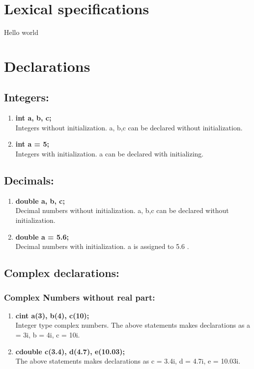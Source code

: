 \documentclass[12pt]{article}
\begin{document}
\section{Lexical specifications}
Hello world 
\section{Declarations}
\subsection{Integers:}

\begin{enumerate}
    \item \textbf{int a, b, c;} \\
        Integers without initialization. a, b,c can be declared without initialization.
    \item  \textbf{int a = 5;}\\
        Integers with initialization. a can be declared with initializing.
\end{enumerate}

\subsection{Decimals:}
\begin{enumerate}
    \item \textbf{double a, b, c;} \\
        Decimal numbers without initialization. a, b,c can be declared without initialization.
    \item  \textbf{double a = 5.6;}\\
        Decimal numbers with initialization. a is assigned to 5.6 .
\end{enumerate}
\subsection{Complex declarations:}
\subsubsection{Complex Numbers without real part:}
\begin{enumerate}
    \item \textbf{cint a(3), b(4), c(10);}\\
Integer type complex numbers.
The above statements makes declarations as a = 3i, b = 4i, c = 10i.
    \item \textbf{cdouble c(3.4), d(4.7), e(10.03);} \\
The above statements makes declarations as c = 3.4i, d = 4.7i, e = 10.03i.
\end{enumerate}
\end{document}
